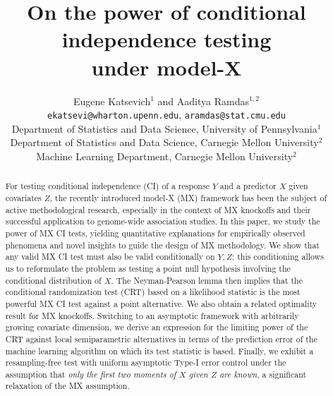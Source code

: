 \documentclass[12pt]{article}
\theoremstyle{definition}
\theoremstyle{remark}
\newcommand{\srz}{Z}
\newcommand{\sry}{Y}
\begin{document}
\title{On the power of conditional independence testing \\ under model-X}
\author{Eugene Katsevich$^1$ and Aaditya Ramdas$^{1,2}$\\
	[10pt]
	\texttt{ekatsevi@wharton.upenn.edu},
	\texttt{aramdas@stat.cmu.edu} \\
	Department of Statistics and Data Science, University of Pennsylvania$^1$\\
	Department of Statistics and Data Science, 	Carnegie Mellon University$^2$\\
	Machine Learning Department, Carnegie Mellon University$^2$
}


\maketitle
\thispagestyle{empty}

	
\begin{abstract}
For testing conditional independence (CI) of a response $Y$ and a predictor $X$ given covariates $Z$, the recently introduced model-X (MX) framework has been the subject of active methodological research, especially in the context of MX knockoffs and their successful application to genome-wide association studies. In this paper, we study the power of MX CI tests, yielding quantitative explanations for empirically observed phenomena and novel insights to guide the design of MX methodology. We show that any valid MX CI test must also be valid conditionally on $\sry, \srz$; this conditioning allows us to reformulate the problem as testing a point null hypothesis involving the conditional distribution of $X$. The Neyman-Pearson lemma then implies that the conditional randomization test (CRT) based on a likelihood statistic is the most powerful MX CI test against a point alternative. We also obtain a related optimality result for MX knockoffs. Switching to an asymptotic framework with arbitrarily growing covariate dimension, we derive an expression for the limiting power of the CRT against local semiparametric alternatives in terms of the prediction error of the machine learning algorithm on which its test statistic is based. Finally, we exhibit a resampling-free test with uniform asymptotic Type-I error control under the assumption that \textit{only the first two moments of $X$ given $Z$ are known}, a significant relaxation of the MX assumption. 
\end{abstract}
	
\end{document}
